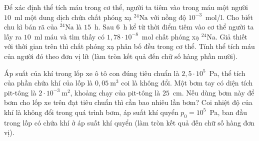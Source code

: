 	\begin{ex}%
		Để xác định thể tích máu trong cơ thể, người ta tiêm vào trong máu một người $10$~ml một dung dịch chứa chất phóng xạ ${}^{24}\text{Na}$ với nồng độ $10^{-3}$~mol/l. Cho biết chu kì bán rã của ${}^{24}\text{Na}$ là $15$~h. Sau $6$~h kể từ thời điểm tiêm vào cơ thể người ta lấy ra $10$~ml máu và tìm thấy có $1{,}78\cdot 10^{-8}$~mol chất phóng xạ ${}^{24}\text{Na}$. Giả thiết với thời gian trên thì chất phóng xạ phân bố đều trong cơ thể. Tính thể tích máu của người đó theo đơn vị lít (làm tròn kết quả đến chữ số hàng phần mười).
		\par
	\end{ex}

	\begin{ex}%
		Áp suất của khí trong lốp xe ô tô con đúng tiêu chuẩn là $2{,}5\cdot 10^5$~Pa, thể tích của phần chứa khí của lốp là $0{,}05~\text{m}^3$ coi là không đổi. Một bơm tay có diện tích pit-tông là $2\cdot 10^{-3}~\text{m}^2$, khoảng chạy của pit-tông là $25$~cm. Nếu dùng bơm này để bơm cho lốp xe trên đạt tiêu chuẩn thì cần bao nhiêu lần bơm? Coi nhiệt độ của khí là không đổi trong quá trình bơm, áp suất khí quyển $p_0=10^5$~Pa, ban đầu trong lốp có chứa khí ở áp suất khí quyển (làm tròn kết quả đến chữ số hàng đơn vị).
		\par
	\end{ex}

